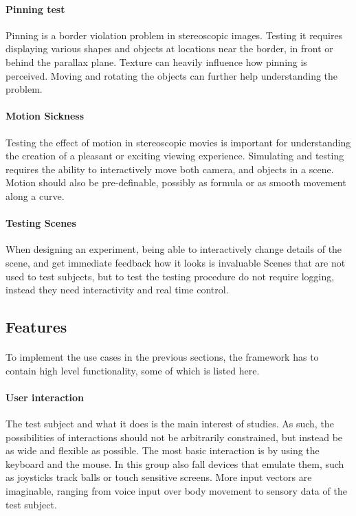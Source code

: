 \paragraph{Pinning test}
Pinning is a border violation problem in stereoscopic images.
Testing it requires displaying various shapes and objects at locations near the border, in front or behind the parallax plane.
Texture can heavily influence how pinning is perceived.
Moving and rotating the objects can further help understanding the problem.

\paragraph{Motion Sickness}
Testing the effect of motion in stereoscopic movies is important for understanding the creation of a pleasant or exciting viewing experience.
Simulating and testing requires the ability to interactively move both camera, and objects in a scene.
Motion should also be pre-definable, possibly as formula or as smooth movement along a curve.

\paragraph{Testing Scenes}
When designing an experiment, being able to interactively change details of the scene, and get immediate feedback how it looks is invaluable
Scenes that are not used to test subjects, but to test the testing procedure do not require logging, instead they need interactivity and real time control.


\subsection{Features}
\paragraph{}
To implement the use cases in the previous sections, the framework has to contain high level functionality, some of which is listed here.

\paragraph{User interaction}
The test subject and what it does is the main interest of studies.
As such, the possibilities of interactions should not be arbitrarily constrained, but instead be as wide and flexible as possible.
The most basic interaction is by using the keyboard and the mouse.
In this group also fall devices that emulate them, such as joysticks track balls or touch sensitive screens.
More input vectors are imaginable, ranging from voice input over body movement to sensory data of the test subject.

